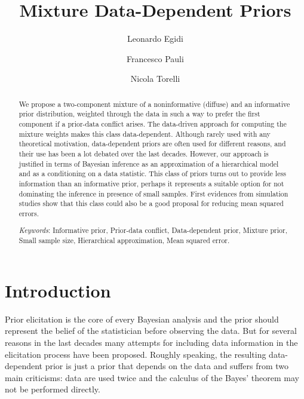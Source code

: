 \documentclass{statsoc}
\title[MDD Priors]{\bf{Mixture Data-Dependent Priors }}
\author[Author 1 {\it et al.}]{Leonardo Egidi}
\author[Author 2]{Francesco Pauli}
\author[Egidi Pauli Torelli]{Nicola Torelli}
\begin{document}
\begin{abstract}

 We propose a two-component mixture of a noninformative (diffuse) and an informative prior distribution, weighted through the data in such a way to prefer the first component if a prior-data conflict arises. The data-driven approach for computing the mixture weights makes this class data-dependent. Although rarely used with any theoretical motivation, data-dependent priors are often used for different reasons, and their use has been a lot debated over the last decades. However, our approach is justified in terms of Bayesian inference as an approximation of a hierarchical model and as a conditioning on a data statistic. This class of priors turns out to provide less information than an informative prior, perhaps it represents a suitable option for not dominating the inference in presence of small samples. First evidences from simulation studies show that this class could also be a good proposal for reducing mean squared errors.

\textit{Keywords}: Informative prior, Prior-data conflict, Data-dependent prior, Mixture prior, Small sample size, Hierarchical approximation, Mean squared error.
\end{abstract}


\section{Introduction}

Prior elicitation is the core of every Bayesian analysis and the prior should represent the belief of the statistician before observing the data. But for several reasons in the last decades many attempts for including data information in the elicitation process have been proposed. Roughly speaking, the resulting data-dependent prior is just a prior that depends on the data and suffers from two main criticisms: data are used twice and the calculus of the Bayes' theorem may not be performed directly. 
\end{document}
